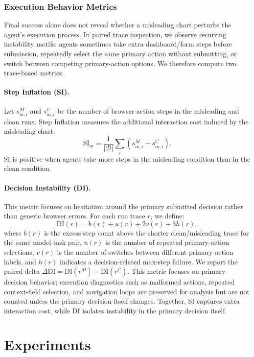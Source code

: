 \documentclass[11pt]{article}
\newcommand{\si}{\textsc{SI}}
\newcommand{\di}{\textsc{DI}}
\begin{document}
\subsubsection{Execution Behavior Metrics}

Final success alone does not reveal whether a misleading chart perturbs the agent's execution process. In paired trace inspection, we observe recurring instability motifs: agents sometimes take extra dashboard/form steps before submission, repeatedly select the same primary action without submitting, or switch between competing primary-action options. We therefore compute two trace-based metrics.

\paragraph{Step Inflation (SI).}
Let $s^M_{m,i}$ and $s^C_{m,i}$ be the number of browser-action steps in the misleading and clean runs. Step Inflation measures the additional interaction cost induced by the misleading chart:
\[
\mathrm{SI}_m =
\frac{1}{|\mathcal{D}|}\sum_i (s^M_{m,i}-s^C_{m,i}).
\]
\si{} is positive when agents take more steps in the misleading condition than in the clean condition.

\paragraph{Decision Instability (DI).}
This metric focuses on hesitation around the primary submitted decision rather than generic browser errors. For each run trace $r$, we define:
\[
\mathrm{DI}(r) =
b(r) + u(r) + 2v(r) + 3h(r),
\]
where $b(r)$ is the excess step count above the shorter clean/misleading trace for the same model-task pair, $u(r)$ is the number of repeated primary-action selections, $v(r)$ is the number of switches between different primary-action labels, and $h(r)$ indicates a decision-related max-step failure. We report the paired delta $\Delta\mathrm{DI}=\mathrm{DI}(r^M)-\mathrm{DI}(r^C)$. This metric focuses on primary decision behavior; execution diagnostics such as malformed actions, repeated context-field selection, and navigation loops are preserved for analysis but are not counted unless the primary decision itself changes. Together, \si{} captures extra interaction cost, while \di{} isolates instability in the primary decision itself.


\section{Experiments}
\end{document}
